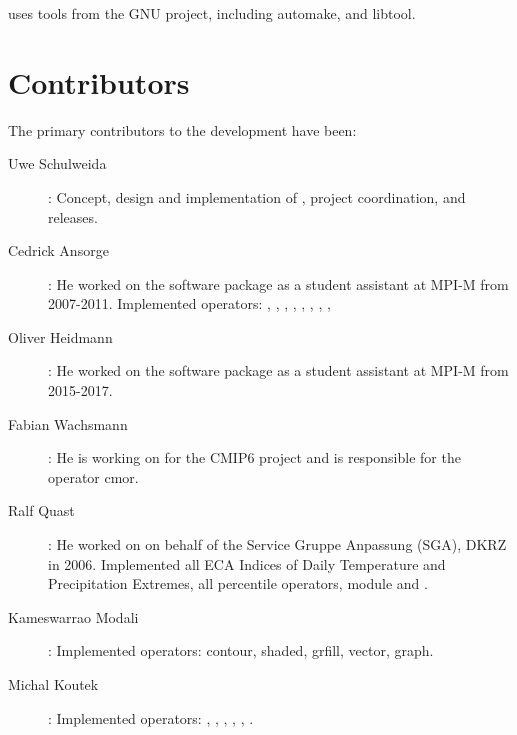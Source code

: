 {\CDO} uses tools from the GNU project, including automake, and libtool. 

\section{Contributors}

The primary contributors to the {\CDO} development have been: 

\begin{description}
\item[Uwe Schulweida]: Concept, design and implementation of {\CDO}, project coordination, and releases.



\item[Cedrick Ansorge]: He worked on the {\CDO} software package as a student assistant at MPI-M from 2007-2011.
Implemented operators: {}, {}, {}, {},
 {}, {}, {}, {}, {}

\item[Oliver Heidmann]: He worked on the {\CDO} software package as a student assistant at MPI-M from 2015-2017.

\item[Fabian Wachsmann]: He is working on {\CDO} for the CMIP6 project and is responsible for the operator cmor.

\item[Ralf Quast]: He worked on {\CDO} on behalf of the Service Gruppe Anpassung (SGA), DKRZ in 2006.
Implemented all ECA Indices of Daily Temperature and Precipitation Extremes, 
all percentile operators, module {} and {}.

\item[Kameswarrao Modali]: Implemented operators: contour, shaded, grfill, vector, graph.

\item[Michal Koutek]: Implemented operators: {}
{}, {}, {},
{}, {}, {}.


\end{description}
